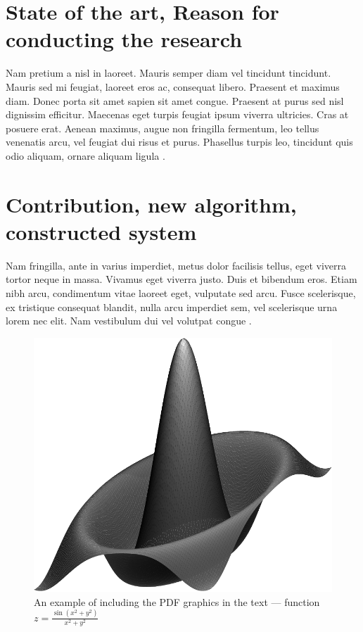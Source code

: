 \documentclass[10pt]{article}
\begin{document}
\section{State of the art, Reason for conducting the research}

Nam pretium a nisl in laoreet. Mauris semper diam vel tincidunt tincidunt. Mauris sed mi feugiat, laoreet eros ac, consequat libero. Praesent et maximus diam. Donec porta sit amet sapien sit amet congue. Praesent at purus sed nisl dignissim efficitur. Maecenas eget turpis feugiat ipsum viverra ultricies. Cras at posuere erat. Aenean maximus, augue non fringilla fermentum, leo tellus venenatis arcu, vel feugiat dui risus et purus. Phasellus turpis leo, tincidunt quis odio aliquam, ornare aliquam ligula \cite{curse}. 

\section{Contribution, new algorithm, constructed system}

Nam fringilla, ante in varius imperdiet, metus dolor facilisis tellus, eget viverra tortor neque in massa. Vivamus eget viverra justo. Duis et bibendum eros. Etiam nibh arcu, condimentum vitae laoreet eget, vulputate sed arcu. Fusce scelerisque, ex tristique consequat blandit, nulla arcu imperdiet sem, vel scelerisque urna lorem nec elit. Nam vestibulum dui vel volutpat congue \cite{mixture}.

\begin{figure}[!ht]
\centering
\includegraphics[scale=.4]{surfz}
\caption{An example of including the PDF graphics in the text ---
function $z=\frac{\sin(x^2+y^2)}{x^2+y^2}$}
\label{rys:surf}
\end{figure}
\end{document}
